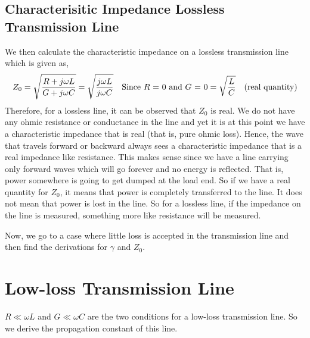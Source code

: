 \subsection{Characterisitic Impedance Lossless Transmission Line}
We then calculate the characteristic impedance on a lossless transmission line which is given as,
\begin{dmath*}
Z_0 = \sqrt{\frac{R + j\omega L}{G + j\omega C}}
= \sqrt{\frac{j\omega L}{j\omega C}}\quad\text{Since }R\text{ = }0\text{ and }G\text{ = }0
= \sqrt{\frac{L}{C}} \quad\textnormal{(real quantity)}
\end{dmath*}
Therefore, for a lossless line, it can be observed that $Z_0$ is real. We do not have any ohmic resistance or conductance in the line and yet it is at this point we have a characteristic impedance that is real (that is, pure ohmic loss). Hence, the wave that travels forward or backward always sees a characteristic impedance that is a real impedance like resistance. This makes sense since we have a line carrying only forward waves which will go forever and no energy is reflected. That is, power somewhere is going to get dumped at the load end. So if we have a real quantity for $Z_0$, it means that power is completely transferred to the line. It does not mean that power is lost in the line. So for a lossless line, if the impedance on the line is measured, something more like resistance will be measured.

Now, we go to a case where little loss is accepted in the transmission line and then find the derivations for $\gamma$ and $Z_0$.

\section{Low-loss Transmission Line}
$R\ll\omega L$ and $G\ll\omega C$ are the two conditions for a low-loss transmission line. So we derive the propagation constant of this line.

